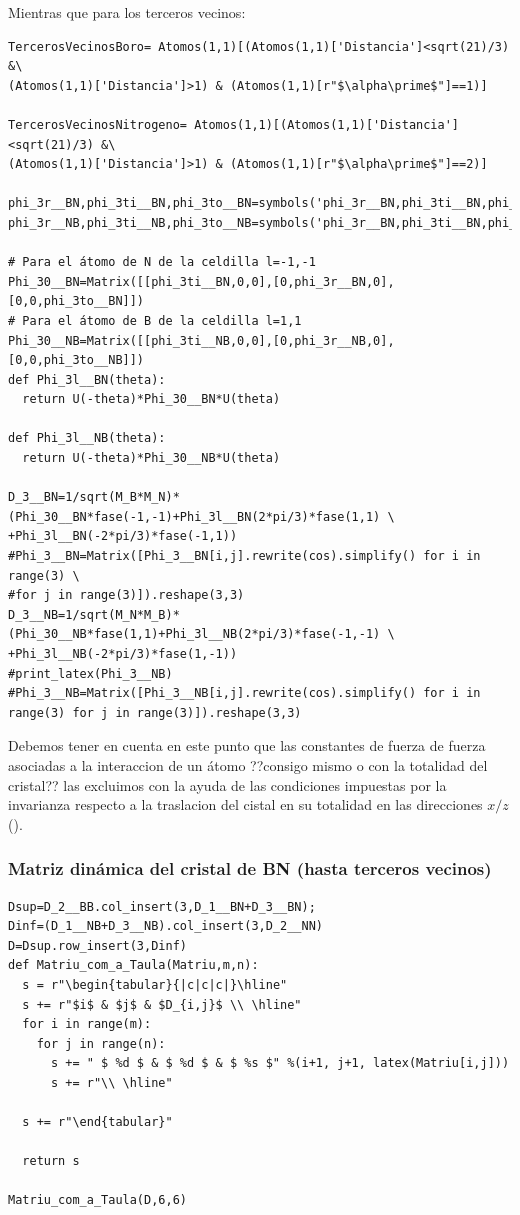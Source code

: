 \documentclass[12pt,a4paper]{article}
\begin{document}
\newpage

Mientras que para los terceros vecinos:
\begin{verbatim}
TercerosVecinosBoro= Atomos(1,1)[(Atomos(1,1)['Distancia']<sqrt(21)/3) &\
(Atomos(1,1)['Distancia']>1) & (Atomos(1,1)[r"$\alpha\prime$"]==1)]

TercerosVecinosNitrogeno= Atomos(1,1)[(Atomos(1,1)['Distancia']<sqrt(21)/3) &\
(Atomos(1,1)['Distancia']>1) & (Atomos(1,1)[r"$\alpha\prime$"]==2)]

phi_3r__BN,phi_3ti__BN,phi_3to__BN=symbols('phi_3r__BN,phi_3ti__BN,phi_3to__BN')
phi_3r__NB,phi_3ti__NB,phi_3to__NB=symbols('phi_3r__BN,phi_3ti__BN,phi_3to__BN')

# Para el átomo de N de la celdilla l=-1,-1  
Phi_30__BN=Matrix([[phi_3ti__BN,0,0],[0,phi_3r__BN,0],[0,0,phi_3to__BN]])
# Para el átomo de B de la celdilla l=1,1
Phi_30__NB=Matrix([[phi_3ti__NB,0,0],[0,phi_3r__NB,0],[0,0,phi_3to__NB]])
def Phi_3l__BN(theta):
  return U(-theta)*Phi_30__BN*U(theta)

def Phi_3l__NB(theta):
  return U(-theta)*Phi_30__NB*U(theta)

D_3__BN=1/sqrt(M_B*M_N)*(Phi_30__BN*fase(-1,-1)+Phi_3l__BN(2*pi/3)*fase(1,1) \
+Phi_3l__BN(-2*pi/3)*fase(-1,1))
#Phi_3__BN=Matrix([Phi_3__BN[i,j].rewrite(cos).simplify() for i in range(3) \
#for j in range(3)]).reshape(3,3)
D_3__NB=1/sqrt(M_N*M_B)*(Phi_30__NB*fase(1,1)+Phi_3l__NB(2*pi/3)*fase(-1,-1) \
+Phi_3l__NB(-2*pi/3)*fase(1,-1))
#print_latex(Phi_3__NB)
#Phi_3__NB=Matrix([Phi_3__NB[i,j].rewrite(cos).simplify() for i in range(3) for j in range(3)]).reshape(3,3)
\end{verbatim}

Debemos tener en cuenta en este punto que las  constantes de fuerza de fuerza asociadas a la interaccion de un átomo \color{red}??consigo mismo o con la totalidad del cristal?? \normalcolor las excluimos con la ayuda de las condiciones impuestas por la invarianza respecto a la traslacion del cistal en su totalidad en las direcciones \(x/z\) (\cite{falkovsky08_symmet_const_phonon_disper_graph}).


\subsubsection{Matriz dinámica del cristal de BN (hasta terceros vecinos)}
\label{sec:org2fc6d18}

\begin{verbatim}
Dsup=D_2__BB.col_insert(3,D_1__BN+D_3__BN);
Dinf=(D_1__NB+D_3__NB).col_insert(3,D_2__NN)
D=Dsup.row_insert(3,Dinf)
def Matriu_com_a_Taula(Matriu,m,n):
  s = r"\begin{tabular}{|c|c|c|}\hline"
  s += r"$i$ & $j$ & $D_{i,j}$ \\ \hline"
  for i in range(m):
    for j in range(n):
      s += " $ %d $ & $ %d $ & $ %s $" %(i+1, j+1, latex(Matriu[i,j]))
      s += r"\\ \hline"

  s += r"\end{tabular}"

  return s

Matriu_com_a_Taula(D,6,6)
\end{verbatim}
\end{document}
